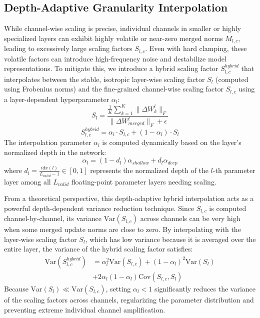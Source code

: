 \documentclass{article}
\theoremstyle{plain}
\theoremstyle{definition}
\theoremstyle{remark}
\begin{document}
\subsection{Depth-Adaptive Granularity Interpolation}
While channel-wise scaling is precise, individual channels in smaller or highly specialized layers can exhibit highly volatile or near-zero merged norms $M_{l,c}$, leading to excessively large scaling factors $S_{l,c}$. Even with hard clamping, these volatile factors can introduce high-frequency noise and destabilize model representations. To mitigate this, we introduce a hybrid scaling factor $S_{l,c}^{hybrid}$ that interpolates between the stable, isotropic layer-wise scaling factor $S_l$ (computed using Frobenius norms) and the fine-grained channel-wise scaling factor $S_{l,c}$ using a layer-dependent hyperparameter $\alpha_l$:
\begin{equation}
    S_l = \frac{\frac{1}{K} \sum_{k=1}^K \|\Delta W_k^l\|_F}{\|\Delta W_{merged}^l\|_F + \epsilon}
\end{equation}
\begin{equation}
    S_{l,c}^{hybrid} = \alpha_l \cdot S_{l,c} + (1 - \alpha_l) \cdot S_l
\end{equation}
The interpolation parameter $\alpha_l$ is computed dynamically based on the layer's normalized depth in the network:
\begin{equation}
    \alpha_l = (1 - d_l)\alpha_{shallow} + d_l\alpha_{deep}
\end{equation}
where $d_l = \frac{idx(l)}{L_{valid} - 1} \in [0, 1]$ represents the normalized depth of the $l$-th parameter layer among all $L_{valid}$ floating-point parameter layers needing scaling.

From a theoretical perspective, this depth-adaptive hybrid interpolation acts as a powerful depth-dependent variance reduction technique. Since $S_{l,c}$ is computed channel-by-channel, its variance $\text{Var}(S_{l,c})$ across channels can be very high when some merged update norms are close to zero. By interpolating with the layer-wise scaling factor $S_l$, which has low variance because it is averaged over the entire layer, the variance of the hybrid scaling factor satisfies:
\begin{equation}
\begin{split}
    \text{Var}(S_{l,c}^{hybrid}) &= \alpha_l^2 \text{Var}(S_{l,c}) + (1-\alpha_l)^2 \text{Var}(S_l) \\
    &+ 2\alpha_l(1-\alpha_l)\text{Cov}(S_{l,c}, S_l)
\end{split}
\end{equation}
Because $\text{Var}(S_l) \ll \text{Var}(S_{l,c})$, setting $\alpha_l < 1$ significantly reduces the variance of the scaling factors across channels, regularizing the parameter distribution and preventing extreme individual channel amplification.
\end{document}
